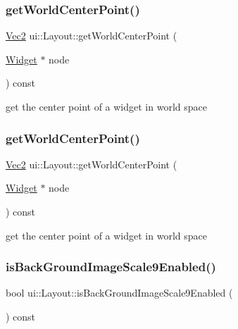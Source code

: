 \subsubsection{\texorpdfstring{get\+World\+Center\+Point()}{getWorldCenterPoint()}\hspace{0.1cm}{\footnotesize\ttfamily [1/2]}}
{\footnotesize\ttfamily \hyperlink{classVec2}{Vec2} ui\+::\+Layout\+::get\+World\+Center\+Point (\begin{DoxyParamCaption}\item[{\hyperlink{classui_1_1Widget}{Widget} $\ast$}]{node }\end{DoxyParamCaption}) const\hspace{0.3cm}{\ttfamily [protected]}}

get the center point of a widget in world space \mbox{\label{classui_1_1Layout_af1792e929add190f4d14bef493139e5d}} 
\subsubsection{\texorpdfstring{get\+World\+Center\+Point()}{getWorldCenterPoint()}\hspace{0.1cm}{\footnotesize\ttfamily [2/2]}}
{\footnotesize\ttfamily \hyperlink{classVec2}{Vec2} ui\+::\+Layout\+::get\+World\+Center\+Point (\begin{DoxyParamCaption}\item[{\hyperlink{classui_1_1Widget}{Widget} $\ast$}]{node }\end{DoxyParamCaption}) const\hspace{0.3cm}{\ttfamily [protected]}}

get the center point of a widget in world space \mbox{\label{classui_1_1Layout_afcf5c9d16219499c4dacedc2704972af}} 
\subsubsection{\texorpdfstring{is\+Back\+Ground\+Image\+Scale9\+Enabled()}{isBackGroundImageScale9Enabled()}\hspace{0.1cm}{\footnotesize\ttfamily [1/2]}}
{\footnotesize\ttfamily bool ui\+::\+Layout\+::is\+Back\+Ground\+Image\+Scale9\+Enabled (\begin{DoxyParamCaption}{ }\end{DoxyParamCaption}) const}

